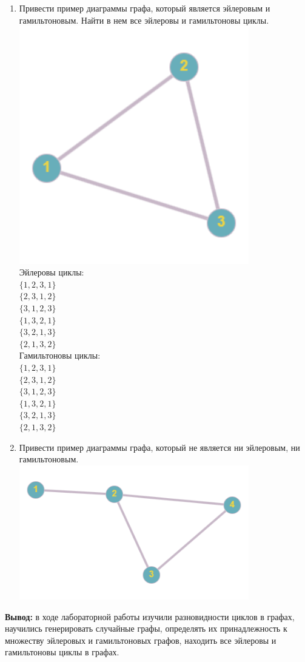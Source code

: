 \documentclass[a4paper,14pt]{extarticle}
\begin{document}
\begin{enumerate}[1.]
\item Привести пример диаграммы графа, который является эйлеровым
и гамильтоновым. Найти в нем все эйлеровы и гамильтоновы циклы.\\
\includegraphics[width=100mm]{6}\\
Эйлеровы циклы:\\
$\{1, 2, 3, 1\}$\\
$\{2, 3, 1, 2\}$\\
$\{3, 1, 2, 3\}$\\
$\{1, 3, 2, 1\}$\\
$\{3, 2, 1, 3\}$\\
$\{2, 1, 3, 2\}$\\
Гамильтоновы циклы:\\
$\{1, 2, 3, 1\}$\\
$\{2, 3, 1, 2\}$\\
$\{3, 1, 2, 3\}$\\
$\{1, 3, 2, 1\}$\\
$\{3, 2, 1, 3\}$\\
$\{2, 1, 3, 2\}$

\item Привести пример диаграммы графа, который не является ни
эйлеровым, ни гамильтоновым.\\
\includegraphics[width=100mm]{7}

\end{enumerate}
\textbf{Вывод: } в ходе лабораторной работы изучили разновидности циклов в графах, научились генерировать случайные графы,
определять их принадлежность к множеству эйлеровых и гамильтоновых графов, находить все эйлеровы и гамильтоновы циклы в графах.
\end{document}
